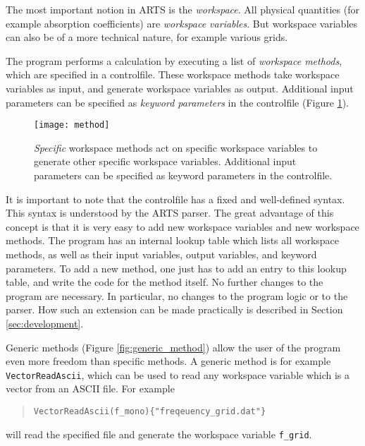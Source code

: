 \label{sec:concept:arts}

The most important notion in ARTS is the \emph{workspace}. All
physical quantities (for example absorption coefficients) are
\emph{workspace variables}. But workspace variables can also be of
a more technical nature, for example various grids. 

The program performs a calculation by executing a list of
\emph{workspace methods}, which are specified in a
controlfile. These workspace methods take workspace variables as
input, and generate workspace variables as output. Additional
input parameters can be specified as \emph{keyword parameters} in
the controlfile (Figure \ref{fig:method}).

\begin{figure}
  \begin{center}
    \texttt{[image: method]}
    \caption{\emph{Specific}
        workspace methods act on specific workspace variables to
        generate other specific workspace variables. Additional input
        parameters can be specified as keyword parameters in the
        controlfile.}
    \label{fig:method}
  \end{center}
\end{figure}

It is important to note that the controlfile has a fixed and
well-defined syntax. This syntax is understood by the ARTS parser.
The great advantage of this concept is that it is very easy to add
new workspace variables and new workspace methods. The program has
an internal lookup table which lists all workspace methods, as well
as their input variables, output variables, and keyword
parameters. To add a new method, one just has to add an entry to
this lookup table, and write the code for the method itself. No
further changes to the program are necessary. In particular, no
changes to the program logic or to the parser. How such an extension
can be made practically is described in Section \ref{sec:development}.


\label{sec:concept:generic}

Generic methods (Figure \ref{fig:generic_method}) allow the user of the
program even more freedom than specific methods. A generic method is
for example \verb|VectorReadAscii|, which can be used to read any
workspace variable which is a vector from an ASCII file. For example
\begin{quote}
  \verb|VectorReadAscii(f_mono){"freqeuency_grid.dat"}|
\end{quote}
will read the specified file and generate the workspace variable
\verb|f_grid|.

